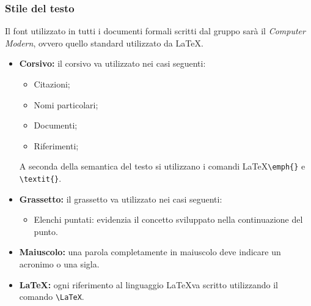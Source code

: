 \documentclass[a4paper]{report}
\begin{document}
	\subsubsection{Stile del testo}
		Il font utilizzato in tutti i documenti formali scritti dal gruppo sarà il \emph{Computer Modern}, ovvero
		quello standard utilizzato da \LaTeX.
	\begin{itemize}
		\item \textbf{Corsivo:} il corsivo va utilizzato nei casi seguenti:
		\begin{itemize}
			\item Citazioni;
			\item Nomi particolari;
			\item Documenti;
			\item Riferimenti;
		\end{itemize}
		A seconda della semantica del testo si utilizzano i comandi \LaTeX \space \verb|\emph{}| e \verb|\textit{}|.
		\item \textbf{Grassetto:} il grassetto va utilizzato nei casi seguenti:
		\begin{itemize}
			\item Elenchi puntati: evidenzia il concetto sviluppato nella continuazione del punto.
		\end{itemize}
		\item \textbf{Maiuscolo:} una parola completamente in maiuscolo deve indicare un acronimo o una sigla.
		\item \textbf{\LaTeX:} ogni riferimento al linguaggio \LaTeX \space va scritto utilizzando il comando
		\verb|\LaTeX|.
	\end{itemize}
\end{document}

